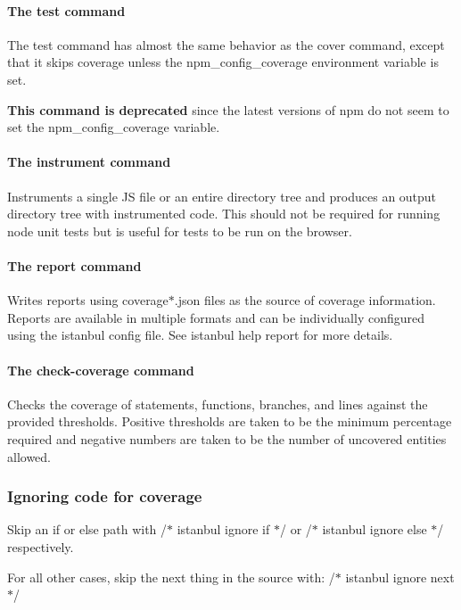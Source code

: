 \paragraph*{The {\ttfamily test} command}

The {\ttfamily test} command has almost the same behavior as the {\ttfamily cover} command, except that it skips coverage unless the {\ttfamily npm\+\_\+config\+\_\+coverage} environment variable is set.

{\bfseries This command is deprecated} since the latest versions of npm do not seem to set the {\ttfamily npm\+\_\+config\+\_\+coverage} variable.

\paragraph*{The {\ttfamily instrument} command}

Instruments a single J\+S file or an entire directory tree and produces an output directory tree with instrumented code. This should not be required for running node unit tests but is useful for tests to be run on the browser.

\paragraph*{The {\ttfamily report} command}

Writes reports using {\ttfamily coverage$\ast$.json} files as the source of coverage information. Reports are available in multiple formats and can be individually configured using the istanbul config file. See {\ttfamily istanbul help report} for more details.

\paragraph*{The {\ttfamily check-\/coverage} command}

Checks the coverage of statements, functions, branches, and lines against the provided thresholds. Positive thresholds are taken to be the minimum percentage required and negative numbers are taken to be the number of uncovered entities allowed.

\subsubsection*{Ignoring code for coverage}


\begin{DoxyItemize}
\item Skip an {\ttfamily if} or {\ttfamily else} path with {\ttfamily /$\ast$ istanbul ignore if $\ast$/} or {\ttfamily /$\ast$ istanbul ignore else $\ast$/} respectively.
\item For all other cases, skip the next \textquotesingle{}thing\textquotesingle{} in the source with\+: {\ttfamily /$\ast$ istanbul ignore next $\ast$/}
\end{DoxyItemize}

